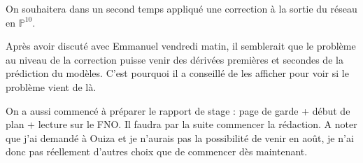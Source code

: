 \documentclass[french]{article}
\begin{document}
	On souhaitera dans un second temps appliqué une correction à la sortie du réseau en $\mathbb{P}^{10}$. 
	
	Après avoir discuté avec Emmanuel vendredi matin, il semblerait que le problème au niveau de la correction puisse venir des dérivées premières et secondes de la prédiction du modèles. C'est pourquoi il a conseillé de les afficher pour voir si le problème vient de là.
	
	On a aussi commencé à préparer le rapport de stage : page de garde + début de plan + lecture sur le FNO. Il faudra par la suite commencer la rédaction. A noter que j'ai demandé à Ouiza et je n'aurais pas la possibilité de venir en août, je n'ai donc pas réellement d'autres choix que de commencer dès maintenant.
\end{document}
